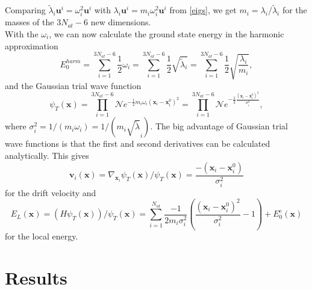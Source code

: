 \documentclass [12pt]{report}
\begin{document}
Comparing $\tilde{\lambda}_i \bm{u}^i = \omega_i^2 \bm{u}^i$ with $\lambda_i \bm{u}^i = m_i \omega_i^2 \bm{u}^i$ from \eqref{eigs}, we get $m_i = \lambda_i / \tilde{\lambda}_i$ for the masses of the $3 N_{at} - 6$ new dimensions.\\
With the $\omega_i$, we can now calculate the ground state energy in the harmonic approximation
\begin{equation}
E_0^{harm} = \sum_{i=1}^{3N_{at}-6} \frac{1}{2} \omega_i = \sum_{i=1}^{3N_{at}-6} \frac{1}{2} \sqrt{\tilde{\lambda}_i} = \sum_{i=1}^{3N_{at}-6} \frac{1}{2} \sqrt{\frac{\lambda_i}{m_i}},
\end{equation}
and the Gaussian trial wave function
\begin{equation}
\psi_T(\bm{x}) = \prod_{i=1}^{3N_{at}-6} \mathcal{N} e^{-\frac{1}{2} m_i \omega_i (\bm{x}_i - \bm{x}^0_i)^2} = \prod_{i=1}^{3N_{at}-6} \mathcal{N} e^{-\frac{1}{2} \frac{(\bm{x}_i - \bm{x}^0_i)^2}{\sigma_i^2}},
\end{equation}
where $\sigma_i^2 = 1/(m_i \omega_i) = 1/(m_i\sqrt{\tilde{\lambda}}_i)$. 
The big advantage of Gaussian trial wave functions is that the first and second derivatives can be calculated analytically. This gives
\begin{equation}
\bm{v}_i(\bm{x}) = \nabla_{\bm{x}_i} \psi_T(\bm{x})/ \psi_T(\bm{x}) = \frac{-(\bm{x}_i - \bm{x}^0_i)}{\sigma_i^2}
\end{equation}
for the drift velocity and 
\begin{equation}\label{el}
E_L(\bm{x}) = (H\psi_T(\bm{x}))/\psi_T(\bm{x}) = \sum_{i=1}^{N_{at}} \frac{-1}{2m_i \sigma^2_i} \left( \frac{(\bm{x}_i - \bm{x}^0_i)^2}{\sigma^2_i} - 1 \right) + E_0^e(\bm{x})
\end{equation}
for the local energy.

\chapter{Results}
\end{document}
